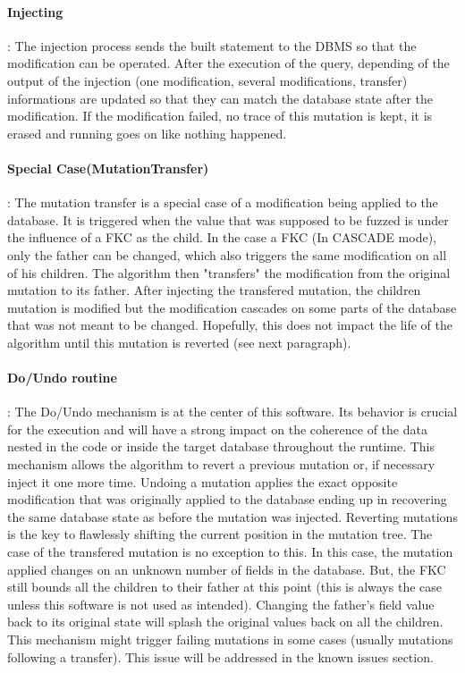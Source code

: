 \documentclass{article}
\begin{document}
\begin{empfile}
				\paragraph{Injecting} :
The injection process sends the built statement to the DBMS so that the modification can be operated. After the execution of the query, depending of the output of the injection (one modification, several modifications, transfer) informations are updated so that they can match the database state after the modification. If the modification failed, no trace of this mutation is kept, it is erased and running goes on like nothing happened.  				
				\paragraph{Special Case(MutationTransfer)} :
The mutation transfer is a special case of a modification being applied to the database.
It is triggered when the value that was supposed to be fuzzed is under the influence of a FKC as the child.
In the case a FKC (In CASCADE mode), only the father can be changed, which also triggers the same modification on all of his children. The algorithm then "transfers" the modification from the original mutation to its father.
After injecting the transfered mutation, the children mutation is modified but the modification cascades on some parts of the database that was not meant to be changed.
Hopefully, this does not impact the life of the algorithm until this mutation is reverted (see next paragraph).
				\paragraph{Do/Undo routine} :
The Do/Undo mechanism is at the center of this software. Its behavior is crucial for the execution and will have a strong impact on the coherence of the data nested in the code or inside the target database throughout the runtime.
This mechanism allows the algorithm to revert a previous mutation or, if necessary inject it one more time. 
Undoing a mutation applies the exact opposite modification that was originally applied to the database ending up in recovering the same database state as before the mutation was injected.
Reverting mutations is the key to flawlessly shifting the current position in the mutation tree.
The case of the transfered mutation is no exception to this. In this case, the mutation applied changes on an unknown number of fields in the database. But, the FKC still bounds all the children to their father at this point (this is always the case unless this software is not used as intended).  
Changing the father's field value back to its original state will splash the original values back on all the children.
This mechanism might trigger failing mutations in some cases (usually mutations following a transfer). This issue will be addressed in the known issues section. 


\end{empfile}
\end{document}
